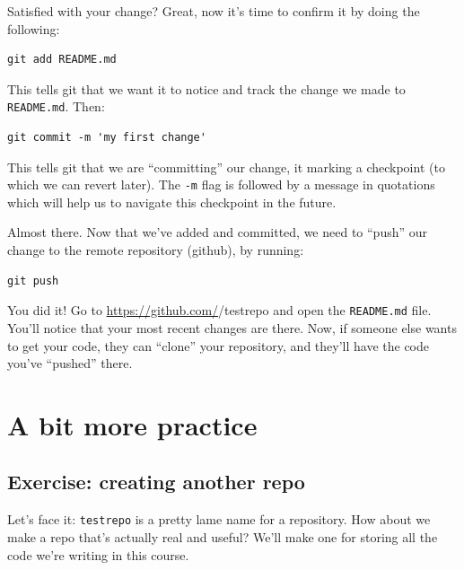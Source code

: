 \documentclass[
]{book}
\begin{document}
Satisfied with your change? Great, now it's time to confirm it by doing the following:

\begin{verbatim}
git add README.md
\end{verbatim}

This tells git that we want it to notice and track the change we made to \texttt{README.md}. Then:

\begin{verbatim}
git commit -m 'my first change'
\end{verbatim}

This tells git that we are ``committing'' our change, it marking a checkpoint (to which we can revert later). The \texttt{-m} flag is followed by a message in quotations which will help us to navigate this checkpoint in the future.

Almost there. Now that we've added and committed, we need to ``push'' our change to the remote repository (github), by running:

\begin{verbatim}
git push
\end{verbatim}

You did it! Go to \url{https://github.com/}/testrepo and open the \texttt{README.md} file. You'll notice that your most recent changes are there. Now, if someone else wants to get your code, they can ``clone'' your repository, and they'll have the code you've ``pushed'' there.

\hypertarget{a-bit-more-practice}{%
\section*{A bit more practice}\label{a-bit-more-practice}}

\hypertarget{exercise-creating-another-repo}{%
\subsection*{Exercise: creating another repo}\label{exercise-creating-another-repo}}

Let's face it: \texttt{testrepo} is a pretty lame name for a repository. How about we make a repo that's actually real and useful? We'll make one for storing all the code we're writing in this course.
\end{document}
